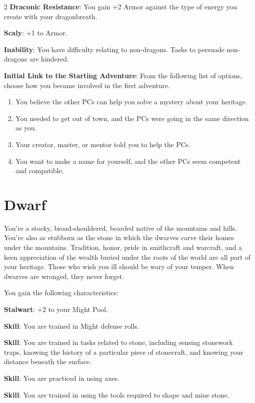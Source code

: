 \begin{multicols}{2}
\textbf{Draconic Resistance}: You gain +2 Armor against the type of energy you create with your dragonbreath. 

\textbf{Scaly}: +1 to Armor. 

\textbf{Inability}: You have difficulty relating to non-dragons. Tasks to persuade non-dragons are hindered. 

\textbf{Initial Link to the Starting Adventure}: From the following list of options, choose how you became involved in the first adventure.

\begin{enumerate}
\item You believe the other PCs can help you solve a mystery about your heritage. 
\item You needed to get out of town, and the PCs were going in the same direction as you. 
\item Your creator, master, or mentor told you to help the PCs. 
\item You want to make a name for yourself, and the other PCs seem competent and compatible.
\end{enumerate}

\section{Dwarf}

You’re a stocky, broad-shouldered, bearded native of the mountains and hills. You’re also as stubborn as the stone in which the dwarves carve their homes under the mountains. Tradition, honor, pride in smithcraft and warcraft, and a keen appreciation of the wealth buried under the roots of the world are all part of your heritage. Those who wish you ill should be wary of your temper. When dwarves are wronged, they never forget.

You gain the following characteristics:

\textbf{Stalwart}: +2 to your Might Pool.

\textbf{Skill}: You are trained in Might defense rolls.

\textbf{Skill}: You are trained in tasks related to stone, including sensing stonework traps, knowing the history of a particular piece of stonecraft, and knowing your distance beneath the surface.

\textbf{Skill}: You are practiced in using axes.

\textbf{Skill}: You are trained in using the tools required to shape and mine stone. 


\end{multicols}
